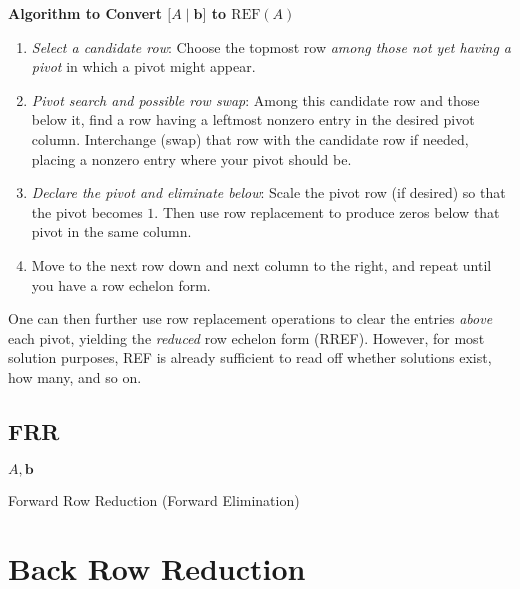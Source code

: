 \documentclass{report}
\begin{document}
{	\textbf{Algorithm to Convert \(\bigl[A\mid \mathbf{b}\bigr]\) to \(\mathrm{REF}(A)\)}
	\begin{enumerate}
		\item \emph{Select a candidate row}: Choose the topmost row \emph{among those not yet having a pivot} in which a pivot might appear.
		\item \emph{Pivot search and possible row swap}: Among this candidate row and those below it, find a row having a leftmost nonzero entry in the desired pivot column. Interchange (swap) that row with the candidate row if needed, placing a nonzero entry where your pivot should be.
		\item \emph{Declare the pivot and eliminate below}: Scale the pivot row (if desired) so that the pivot becomes \(1\). Then use row replacement to produce zeros below that pivot in the same column.
		\item Move to the next row down and next column to the right, and repeat until you have a row echelon form.
	\end{enumerate}

	One can then further use row replacement operations to clear the entries \emph{above} each pivot, yielding the \emph{reduced} row echelon form (RREF). However, for most solution purposes, REF is already sufficient to read off whether solutions exist, how many, and so on.
}
\subsection{FRR}
\begin{algorithm}[H]
	\SetAlgoLined
	\SetNoFillComment
	\Return $A, \mathbf{b}$\;
	\caption{Forward Row Reduction (Forward Elimination)}
\end{algorithm}

\section{Back Row Reduction}

\end{document}
